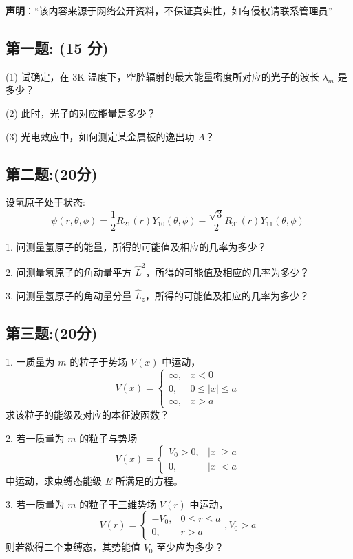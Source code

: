
\textbf{声明}：“该内容来源于网络公开资料，不保证真实性，如有侵权请联系管理员”

\subsection{第一题: (15 分)}
(1) 试确定，在 3K 温度下，空腔辐射的最大能量密度所对应的光子的波长 $\lambda_m$ 是多少？

(2) 此时，光子的对应能量是多少？

(3) 光电效应中，如何测定某金属板的逸出功 $A$？
\subsection{第二题:(20分)}
设氢原子处于状态:$$\psi(r, \theta, \phi) = \frac{1}{2} R_{21}(r) Y_{10}(\theta, \phi) - \frac{\sqrt{3}}{2} R_{31}(r) Y_{11}(\theta, \phi)~$$

1. 问测量氢原子的能量，所得的可能值及相应的几率为多少？

2. 问测量氢原子的角动量平方 \( \hat{L}^2 \)，所得的可能值及相应的几率为多少？

3. 问测量氢原子的角动量分量 \( \hat{L}_z \)，所得的可能值及相应的几率为多少？
\subsection{第三题:(20分)}
1. 一质量为 \( m \) 的粒子于势场 \( V(x) \) 中运动，
$$
V(x) = 
\begin{cases} 
\infty, & x<0 \\
0, & 0 \leq |x| \leq a \\
\infty, & x > a 
\end{cases}~
$$
求该粒子的能级及对应的本征波函数？

2. 若一质量为 \( m \) 的粒子与势场
$$
V(x) = 
\begin{cases} 
V_0 > 0, & |x| \geq a \\
0, & |x| < a 
\end{cases}~
$$
中运动，求束缚态能级 \( E \) 所满足的方程。

3. 若一质量为 \( m \) 的粒子于三维势场 \( V(r) \) 中运动，
$$
V(r) = 
\begin{cases} 
-V_0, & 0 \leq r \leq a \\
0, & r > a
\end{cases},
V_0 > a~
$$
则若欲得二个束缚态，其势能值 \( V_0 \) 至少应为多少？

